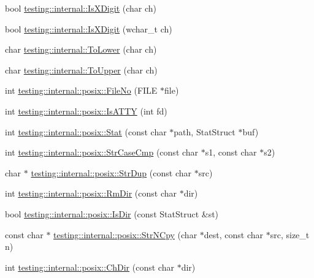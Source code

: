 \begin{DoxyCompactItemize}
\item 
bool \hyperlink{namespacetesting_1_1internal_aa234ef141278263fb143b616c74c86e7}{testing\-::internal\-::\-Is\-X\-Digit} (char ch)
\item 
bool \hyperlink{namespacetesting_1_1internal_a6ab68a30f8291c09b2289c132bbe3b16}{testing\-::internal\-::\-Is\-X\-Digit} (wchar\-\_\-t ch)
\item 
char \hyperlink{namespacetesting_1_1internal_ad9c627ef2a94245e3fd69e7ab3d49b42}{testing\-::internal\-::\-To\-Lower} (char ch)
\item 
char \hyperlink{namespacetesting_1_1internal_ac1b876a8133895bd553d4780ecaa1e3a}{testing\-::internal\-::\-To\-Upper} (char ch)
\item 
int \hyperlink{namespacetesting_1_1internal_1_1posix_a3117b067e1f942a2031e666953120ccc}{testing\-::internal\-::posix\-::\-File\-No} (F\-I\-L\-E $\ast$file)
\item 
int \hyperlink{namespacetesting_1_1internal_1_1posix_a16ebe936b3a8ea462a94191635aedc27}{testing\-::internal\-::posix\-::\-Is\-A\-T\-T\-Y} (int fd)
\item 
int \hyperlink{namespacetesting_1_1internal_1_1posix_a2b87b7ff647a128614daf50667eb9304}{testing\-::internal\-::posix\-::\-Stat} (const char $\ast$path, Stat\-Struct $\ast$buf)
\item 
int \hyperlink{namespacetesting_1_1internal_1_1posix_a1ef2385a7f8e4c706054da35967e76bd}{testing\-::internal\-::posix\-::\-Str\-Case\-Cmp} (const char $\ast$s1, const char $\ast$s2)
\item 
char $\ast$ \hyperlink{namespacetesting_1_1internal_1_1posix_a5c0864ea9d81d27332b9133e35cbc43c}{testing\-::internal\-::posix\-::\-Str\-Dup} (const char $\ast$src)
\item 
int \hyperlink{namespacetesting_1_1internal_1_1posix_acbad5d4ea5b73fd1765f5f760642932a}{testing\-::internal\-::posix\-::\-Rm\-Dir} (const char $\ast$dir)
\item 
bool \hyperlink{namespacetesting_1_1internal_1_1posix_af0d04ed5baeed28353fa38742748a421}{testing\-::internal\-::posix\-::\-Is\-Dir} (const Stat\-Struct \&st)
\item 
const char $\ast$ \hyperlink{namespacetesting_1_1internal_1_1posix_a3defc980438fce16cf5320a458ccea17}{testing\-::internal\-::posix\-::\-Str\-N\-Cpy} (char $\ast$dest, const char $\ast$src, size\-\_\-t n)
\item 
int \hyperlink{namespacetesting_1_1internal_1_1posix_a1ddc8a4fc6bb21da372307485591a212}{testing\-::internal\-::posix\-::\-Ch\-Dir} (const char $\ast$dir)

\end{DoxyCompactItemize}
